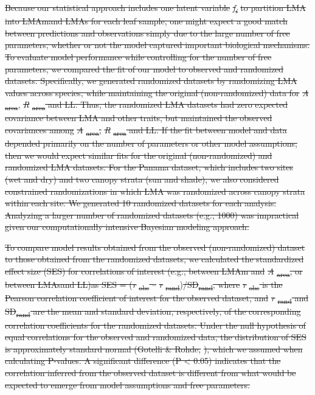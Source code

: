 \documentclass[12pt,]{article}
\theoremstyle{definition}
\theoremstyle{definition}
\theoremstyle{definition}
\theoremstyle{remark}
\providecommand{\DIFaddtex}[1]{{\protect\color{blue}\uwave{#1}}} %
\providecommand{\DIFdeltex}[1]{{\protect\color{red}\sout{#1}}}                      %
\providecommand{\DIFaddbegin}{} %
\providecommand{\DIFaddend}{} %
\providecommand{\DIFdelbegin}{} %
\providecommand{\DIFdelend}{} %
\providecommand{\DIFadd}[1]{\texorpdfstring{\DIFaddtex{#1}}{#1}} %
\providecommand{\DIFdel}[1]{\texorpdfstring{\DIFdeltex{#1}}{}} %
\newcommand{\DIFscaledelfig}{0.5}
\newlength{\DIFdelgraphicswidth} %
\newlength{\DIFdelgraphicsheight} %
\newcommand{\DIFaddincludegraphics}[2][]{{\color{blue}\fbox{\DIFOincludegraphics[#1]{#2}}}} %
\newcommand{\DIFdelincludegraphics}[2][]{%
\sbox{\DIFdelgraphicsbox}{\DIFOincludegraphics[#1]{#2}}%
\settoboxwidth{\DIFdelgraphicswidth}{\DIFdelgraphicsbox} %
\settoboxtotalheight{\DIFdelgraphicsheight}{\DIFdelgraphicsbox} %
\scalebox{\DIFscaledelfig}{%
\parbox[b]{\DIFdelgraphicswidth}{\usebox{\DIFdelgraphicsbox}\\[-\baselineskip] \rule{\DIFdelgraphicswidth}{0em}}\llap{\resizebox{\DIFdelgraphicswidth}{\DIFdelgraphicsheight}{%
\setlength{\unitlength}{\DIFdelgraphicswidth}%
\begin{picture}(1,1)%
\thicklines\linethickness{2pt} %
{\color[rgb]{1,0,0}\put(0,0){\framebox(1,1){}}}%
{\color[rgb]{1,0,0}\put(0,0){\line( 1,1){1}}}%
{\color[rgb]{1,0,0}\put(0,1){\line(1,-1){1}}}%
\end{picture}%
}\hspace*{3pt}}} %
} %
\DeclareRobustCommand{\DIFaddbegin}{\DIFOaddbegin \let\includegraphics\DIFaddincludegraphics} %
\DeclareRobustCommand{\DIFaddend}{\DIFOaddend \let\includegraphics\DIFOincludegraphics} %
\DeclareRobustCommand{\DIFdelbegin}{\DIFOdelbegin \let\includegraphics\DIFdelincludegraphics} %
\DeclareRobustCommand{\DIFdelend}{\DIFOaddend \let\includegraphics\DIFOincludegraphics} %
\begin{document}
\begin{itemize}
\DIFdel{Because our statistical approach includes one latent variable
}\emph{\DIFdel{f\textsubscript{i}}} %
\DIFdel{to partition LMA into LMAmand LMAs for each
leaf sample, one might expect a good match between predictions and
observations simply due to the large number of free parameters, whether
or not the model captured important biological mechanisms. To evaluate
model performance while controlling for the number of free parameters,
we compared the fit of our model to observed and randomized datasets.
Specifically, we generated randomized datasets by randomizing LMA values
across species, while maintaining the original (non-randomized) data for
}\emph{\DIFdel{A}}%
\DIFdel{\textsubscript{area}}\DIFdelend \DIFaddbegin \DIFadd{and
Cov(LMAm}\DIFaddend , \DIFdelbegin \emph{\DIFdel{R}}%
\DIFdel{\textsubscript{area} and LL. Thus,
the randomized LMA datasets had zero expected covariance between LMA and
other traits, but maintained the observed covariances among
}\emph{\DIFdel{A}}%
\DIFdel{\textsubscript{area}, }\emph{\DIFdel{R}}%
\DIFdel{\textsubscript{area} and LL. If
the fit between model and data depended primarily on the number of
parameters or other model assumptions, then we would expect similar fits
for the original (non-randomized) and randomized LMA datasets. For the
Panama dataset, which includes two sites (wet and dry) and two canopy
strata (sun and shade), we also considered constrained randomizations in
which LMA was randomized across canopy strata within each site. We
generated 10 randomized datasets for each analysis. Analyzing a larger
number of randomized datasets (e.g., 1000) was impractical given our
computationally intensive Bayesian modeling approach.
}%

\DIFdel{To compare model results obtained from the observed (non-randomized)
dataset to those obtained from the randomized datasets, we calculated
the standardized effect size (SES) for correlations of interest (e.g.,
between LMAm and }\emph{\DIFdel{A}}%
\DIFdel{\textsubscript{area}, or between LMAsand LL)as SES = (}\emph{\DIFdel{r}}%
\DIFdel{\textsubscript{obs} --
}\emph{\DIFdel{r}}%
\DIFdel{\textsubscript{rand}}\DIFdelend \DIFaddbegin \DIFadd{LMAs}\DIFaddend )\DIFdelbegin \DIFdel{/SD\textsubscript{rand}, where
}\emph{\DIFdel{r}}%
\DIFdel{\textsubscript{obs} is the Pearson correlation coefficient of
interest for the observed dataset, and }\emph{\DIFdel{r}}%
\DIFdel{\textsubscript{rand} and
SD\textsubscript{rand} are the mean and standard deviation,
respectively, of the corresponding correlation coefficients for the
randomized datasets.
Under the null hypothesis of equal correlations for
the observed and randomized data, the distribution of SES is
approximately standard normal (Gotelli \& Rohde,
}%
\DIFdel{), which we assumed when
calculating P-values. A significant difference (P \textless{} 0.05)
indicates that the correlation inferred from the observed dataset is
different from what would be expected to emerge from model assumptions
and free parameters.
}\DIFdelend \DIFaddbegin \DIFadd{.
}\DIFaddend


\end{itemize}
\end{document}
